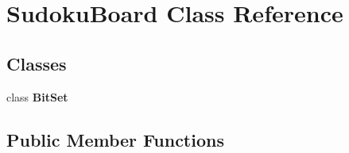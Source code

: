 \hypertarget{classSudokuBoard}{
\section{SudokuBoard Class Reference}
\label{classSudokuBoard}
}
\subsection*{Classes}
\begin{DoxyCompactItemize}
\item 
class {\bfseries BitSet}
\end{DoxyCompactItemize}
\subsection*{Public Member Functions}
